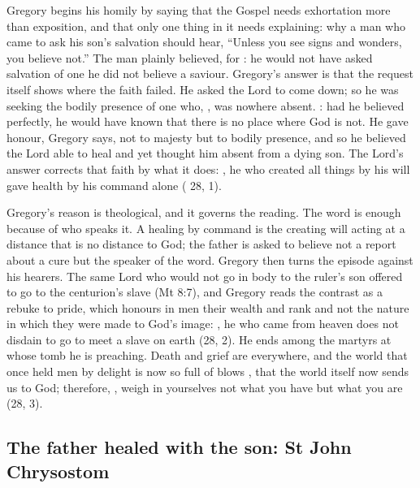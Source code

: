 Gregory begins his homily by saying that the Gospel needs exhortation more than
exposition, and that only one thing in it needs explaining: why a man who came
to ask his son's salvation should hear, ``Unless you see signs and wonders, you
believe not.'' The man plainly believed, for : he would not have asked salvation of one
he did not believe a saviour. Gregory's answer is that the request itself shows
where the faith failed.  He asked the Lord to come down; so he was seeking the bodily presence
of one who, , was nowhere absent. : had
he believed perfectly, he would have known that there is no place where God is
not. He gave honour, Gregory says, not to majesty but to bodily presence, and so
he believed the Lord able to heal and yet thought him absent from a dying son.
The Lord's answer corrects that faith by what it does: , he who created all things by his will
gave health by his command alone ( 28, 1).

Gregory's reason is theological, and it governs the reading. The word is enough
because of who speaks it. A healing by command is the creating will acting at a
distance that is no distance to God; the father is asked to believe not a
report about a cure but the speaker of the word. Gregory then turns the episode
against his hearers. The same Lord who would not go in body to the ruler's son
offered to go to the centurion's slave (Mt 8:7), and Gregory reads the contrast
as a rebuke to pride, which honours in men their wealth and rank and not the
nature in which they were made to God's image: , he who came from heaven does not disdain
to go to meet a slave on earth (28, 2). He ends among the martyrs at whose tomb
he is preaching. Death and grief are everywhere, and the world that once held
men by delight is now so full of blows , that the world itself now sends us to God; therefore, , weigh in yourselves not
what you have but what you are (28, 3).

\subsection{The father healed with the son: St John Chrysostom}

